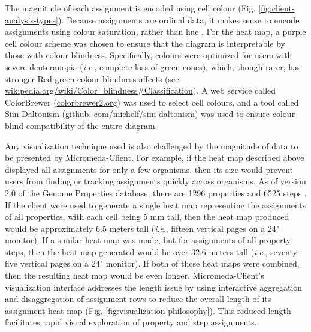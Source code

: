 The magnitude of each assignment is encoded using cell colour (Fig. 
\ref{fig:client-analysis-types}). Because assignments are ordinal data, it makes 
sense to encode assignments using colour saturation, rather than hue 
\cite{munzner2015visualization}. For the heat map, a purple cell colour scheme 
was chosen to ensure that the diagram is interpretable by those with colour 
blindness. Specifically, colours were optimized for users with severe 
deuteranopia (\textit{i}.\textit{e}., complete loss of green cones), which, though rarer, has 
stronger Red-green colour blindness affects (see 
\href{http://wikipedia.org/wiki/Color_blindness#Classification}{wikipedia.org/wiki/Color\_blindness\#Classification}). 
A web service called ColorBrewer 
(\href{http://colorbrewer2.org}{colorbrewer2.org}) was used to select cell 
colours, and a tool called Sim Daltonism 
(\href{http://github.com/michelf/sim-daltonism}{github. 
com/michelf/sim-daltonism}) was used to ensure colour blind compatibility of the 
entire diagram. 

Any visualization technique used is also challenged by the magnitude of data to 
be presented by Micromeda-Client. For example, if the heat map described above 
displayed all assignments for only a few organisms, then its size would prevent 
users from finding or tracking assignments quickly across organisms. As of 
version 2.0 of the Genome Properties database, there are 1296 properties and 
6525 steps \cite{richardson2018genome}. If the client were used to generate a 
single heat map representing the assignments of all properties, with each cell 
being 5 mm tall, then the heat map produced would be approximately 6.5 meters 
tall (\textit{i}.\textit{e}., fifteen vertical pages on a 24" monitor). If a similar heat map was 
made, but for assignments of all property steps, then the heat map generated 
would be over 32.6 meters tall (\textit{i}.\textit{e}., seventy-five vertical pages on a 24" 
monitor). If both of these heat maps were combined, then the resulting heat map 
would be even longer. Micromeda-Client's visualization interface addresses the 
length issue by using interactive aggregation and disaggregation 
\cite{munzner2015visualization} of assignment rows to reduce the overall length 
of its assignment heat map (Fig. \ref{fig:visualization-philosophy}). This 
reduced length facilitates rapid visual exploration of property and step 
assignments.

